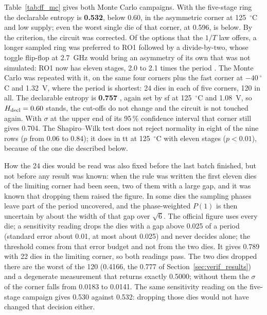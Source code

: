 Table~\ref{tab:ff_mc} gives both Monte Carlo campaigns. With the
five-stage ring the declarable entropy is \textbf{0.532}, below 0.60, in
the asymmetric corner at 125~$^\circ$C and low supply; even the worst
single die of that corner, at 0.596, is below. By the criterion, the
circuit was corrected. Of the options that the $1/T$ law offers, a longer
sampled ring was preferred to RO1 followed by a divide-by-two, whose
toggle flip-flop at 2.7~GHz would bring an asymmetry of its own that was
not simulated: RO1 now has eleven stages, 2.0 to 2.1 times the period
\simu{}. The
Monte Carlo was repeated with it, on the same four corners plus the fast
corner at $-40~^\circ$C and 1.32~V, where the period is shortest: 24 dies
in each of five corners, 120 in all. The declarable entropy is
\textbf{0.757} \simu{}, again set by sf at 125~$^\circ$C and 1.08~V, so
$H_{\mathrm{decl}} = 0.60$ stands, the cut-offs do not change and the circuit is not
touched again. With $\sigma$ at the upper end of its 95\,\% confidence
interval that corner still gives 0.704. The Shapiro--Wilk test does not
reject normality in eight of the nine rows ($p$ from 0.06 to 0.84); it
does in tt at 125~$^\circ$C with eleven stages ($p < 0.01$), because of
the one die described below.

How the 24 dies would be read was also fixed before the last batch
finished, but not before any result was known: when the rule was written
the first eleven dies of the limiting corner had been seen, two of them
with a large gap, and it was known that dropping them raised the figure.
In some dies the sampling phases leave part of the period
uncovered, and the phase-weighted $P(1)$ is then uncertain by about the
width of that gap over $\sqrt{6}$. The official figure uses every die; a
sensitivity reading drops the dies with a gap above 0.025 of a period
(standard error about 0.01, at most about 0.025) and never decides
alone; the threshold comes from that error budget and not from the two
dies. It gives 0.789 with 22 dies
in the limiting corner, so both readings pass. The two dies dropped
there are the worst of the 120 (0.4166, the 0.777 of
Section~\ref{sec:verif_results}) and a degenerate measurement that
returns exactly 0.5000; without them the $\sigma$ of the corner falls
from 0.0183 to 0.0141. The same sensitivity
reading on the five-stage campaign gives 0.530 against 0.532: dropping
those dies would not have changed that decision either.

